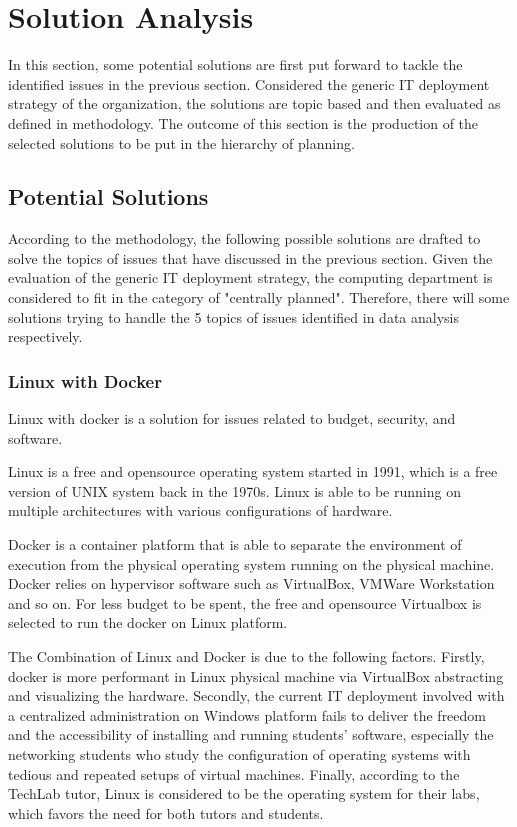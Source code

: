 
\section{Solution Analysis}

In this section, some potential solutions are first put forward to tackle the identified issues in the previous section. Considered the generic IT deployment strategy of the organization, the solutions are topic based and then evaluated as defined in methodology. The outcome of this section is the production of the selected solutions to be put in the hierarchy of planning.

\subsection{Potential Solutions}

According to the methodology, the following possible solutions are drafted to solve the topics of issues that have discussed in the previous section. Given the evaluation of the generic IT deployment strategy, the computing department is considered to fit in the category of "centrally planned". Therefore, there will some solutions trying to handle the 5 topics of issues identified in data analysis respectively.

\subsubsection{Linux with Docker}
Linux with docker is a solution for issues related to budget, security, and software.

Linux is a free and opensource operating system started in 1991, which is a free version of UNIX system back in the 1970s. Linux is able to be running on multiple architectures with various configurations of hardware.

Docker is a container platform that is able to separate the environment of execution from the physical operating system running on the physical machine. Docker relies on hypervisor software such as VirtualBox, VMWare Workstation and so on. For less budget to be spent, the free and opensource Virtualbox is selected to run the docker on Linux platform.

The Combination of Linux and Docker is due to the following factors. Firstly, docker is more performant in Linux physical machine via VirtualBox abstracting and visualizing the hardware. Secondly, the current IT deployment involved with a centralized administration on Windows platform fails to deliver the freedom and the accessibility of installing and running students' software, especially the networking students who study the configuration of operating systems with tedious and repeated setups of virtual machines. Finally, according to the TechLab tutor, Linux is considered to be the operating system for their labs, which favors the need for both tutors and students.

